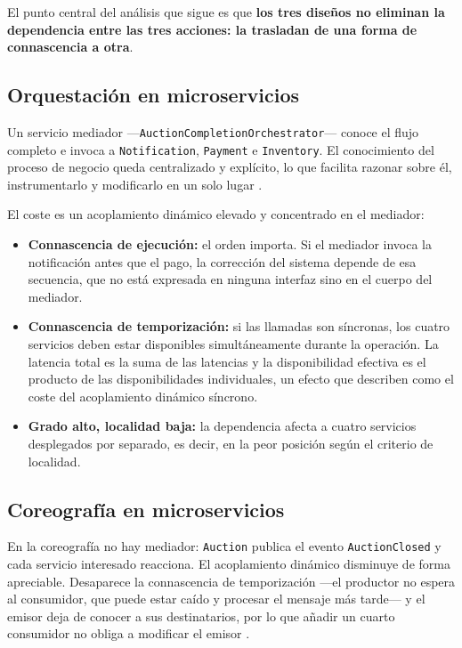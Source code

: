 El punto central del análisis que sigue es que \textbf{los tres diseños no eliminan la dependencia entre las tres acciones: la trasladan de una forma de connascencia a otra}.

\subsection{Orquestación en microservicios}

Un servicio mediador ---\texttt{AuctionCompletionOrchestrator}--- conoce el flujo completo e invoca a \texttt{Notification}, \texttt{Payment} e \texttt{Inventory}. El conocimiento del proceso de negocio queda centralizado y explícito, lo que facilita razonar sobre él, instrumentarlo y modificarlo en un solo lugar \parencite{richardsford2020}.

El coste es un acoplamiento dinámico elevado y concentrado en el mediador:

\begin{itemize}[leftmargin=1.5em]
  \item \textbf{Connascencia de ejecución:} el orden importa. Si el mediador invoca la notificación antes que el pago, la corrección del sistema depende de esa secuencia, que no está expresada en ninguna interfaz sino en el cuerpo del mediador.
  \item \textbf{Connascencia de temporización:} si las llamadas son síncronas, los cuatro servicios deben estar disponibles simultáneamente durante la operación. La latencia total es la suma de las latencias y la disponibilidad efectiva es el producto de las disponibilidades individuales, un efecto que \textcite{fordhardparts2021} describen como el coste del acoplamiento dinámico síncrono.
  \item \textbf{Grado alto, localidad baja:} la dependencia afecta a cuatro servicios desplegados por separado, es decir, en la peor posición según el criterio de localidad.
\end{itemize}

\subsection{Coreografía en microservicios}

En la coreografía no hay mediador: \texttt{Auction} publica el evento \texttt{AuctionClosed} y cada servicio interesado reacciona. El acoplamiento dinámico disminuye de forma apreciable. Desaparece la connascencia de temporización ---el productor no espera al consumidor, que puede estar caído y procesar el mensaje más tarde--- y el emisor deja de conocer a sus destinatarios, por lo que añadir un cuarto consumidor no obliga a modificar el emisor \parencite{richardsford2020}.

